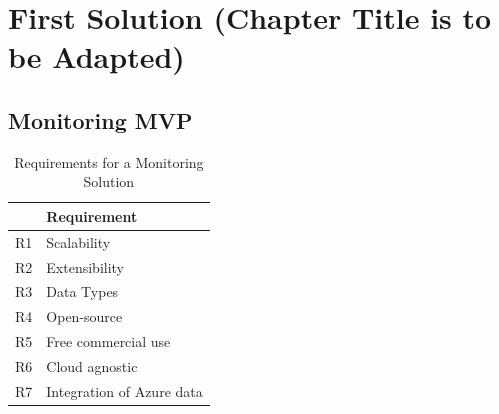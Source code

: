 \chapter{First Solution (Chapter Title is to be Adapted)}




\section{Monitoring MVP}


\begin{table}[]
\begin{tabular}{l|l}
	& Requirement       			\\
\hline
R1 	& Scalability 					\\
R2 	& Extensibility       			\\
R3 	& Data Types 					\\
R4 	& Open-source       			\\
R5 	& Free commercial use  			\\
R6 	& Cloud agnostic       			\\
R7 	& Integration of Azure data
\end{tabular}
\caption{Requirements for a Monitoring Solution}
\label{tab:requirements}
\end{table}

